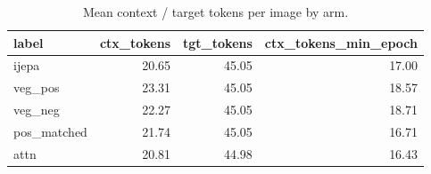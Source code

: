 \begin{table}[t]
\centering
\small
\caption{Mean context / target tokens per image by arm.}
\label{tab:token_budget}
\begin{tabular}{lrrr}
\toprule
label & ctx\_tokens & tgt\_tokens & ctx\_tokens\_min\_epoch \\
\midrule
ijepa & 20.65 & 45.05 & 17.00 \\
veg\_pos & 23.31 & 45.05 & 18.57 \\
veg\_neg & 22.27 & 45.05 & 18.71 \\
pos\_matched & 21.74 & 45.05 & 16.71 \\
attn & 20.81 & 44.98 & 16.43 \\
\bottomrule
\end{tabular}
\end{table}
